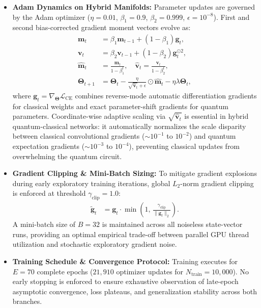\documentclass[pdflatex,sn-mathphys-num]{sn-jnl}%
\theoremstyle{thmstyleone}%
\theoremstyle{thmstyletwo}%
\theoremstyle{thmstylethree}%
\begin{document}
\begin{itemize}
    \item \textbf{Adam Dynamics on Hybrid Manifolds:} Parameter updates are governed by the Adam optimizer ($\eta = 0.01$, $\beta_1 = 0.9$, $\beta_2 = 0.999$, $\epsilon = 10^{-8}$). First and second bias-corrected gradient moment vectors evolve as:
    \begin{align}
    \mathbf{m}_t &= \beta_1 \mathbf{m}_{t-1} + (1-\beta_1) \mathbf{g}_t, \nonumber \\
    \mathbf{v}_t &= \beta_2 \mathbf{v}_{t-1} + (1-\beta_2) \mathbf{g}_t^{\odot 2}, \nonumber \\
    \hat{\mathbf{m}}_t &= \frac{\mathbf{m}_t}{1-\beta_1^t}, \quad \hat{\mathbf{v}}_t = \frac{\mathbf{v}_t}{1-\beta_2^t}, \nonumber \\
    \boldsymbol{\Theta}_{t+1} &= \boldsymbol{\Theta}_t - \frac{\eta}{\sqrt{\hat{\mathbf{v}}_t} + \epsilon} \odot \hat{\mathbf{m}}_t - \eta \lambda \boldsymbol{\Theta}_t,
    \label{eq:adam_hybrid_update}
    \end{align}
    where $\mathbf{g}_t = \nabla_{\boldsymbol{\Theta}} \mathcal{L}_{\mathrm{CE}}$ combines reverse-mode automatic differentiation gradients for classical weights and exact parameter-shift gradients for quantum parameters. Coordinate-wise adaptive scaling via $\sqrt{\hat{\mathbf{v}}_t}$ is essential in hybrid quantum-classical networks: it automatically normalizes the scale disparity between classical convolutional gradients ($\sim 10^{-1}$ to $10^{-2}$) and quantum expectation gradients ($\sim 10^{-3}$ to $10^{-4}$), preventing classical updates from overwhelming the quantum circuit.

    \item \textbf{Gradient Clipping \& Mini-Batch Sizing:} To mitigate gradient explosions during early exploratory training iterations, global $L_2$-norm gradient clipping is enforced at threshold $\gamma_{\mathrm{clip}} = 1.0$:
    \begin{align}
    \tilde{\mathbf{g}}_t &= \mathbf{g}_t \cdot \min\left(1, \, \frac{\gamma_{\mathrm{clip}}}{\|\mathbf{g}_t\|_2}\right).
    \label{eq:gradient_clipping}
    \end{align}
    A mini-batch size of $B = 32$ is maintained across all noiseless state-vector runs, providing an optimal empirical trade-off between parallel GPU thread utilization and stochastic exploratory gradient noise.

    \item \textbf{Training Schedule \& Convergence Protocol:} Training executes for $E = 70$ complete epochs ($21{,}910$ optimizer updates for $N_{\mathrm{train}} = 10{,}000$). No early stopping is enforced to ensure exhaustive observation of late-epoch asymptotic convergence, loss plateaus, and generalization stability across both branches.


\end{itemize}
\end{document}
